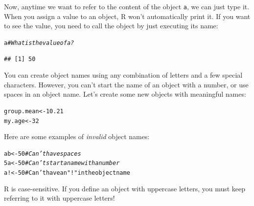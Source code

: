 \documentclass{tufte-book}\usepackage[]{graphicx}\usepackage[]{color}
\makeatletter
\newcommand{\hlnum}[1]{\textcolor[rgb]{0.686,0.059,0.569}{#1}}%
\newcommand{\hlstr}[1]{\textcolor[rgb]{0.192,0.494,0.8}{#1}}%
\newcommand{\hlcom}[1]{\textcolor[rgb]{0.678,0.584,0.686}{\textit{#1}}}%
\newcommand{\hlstd}[1]{\textcolor[rgb]{0.345,0.345,0.345}{#1}}%
\newcommand{\hlkwb}[1]{\textcolor[rgb]{0.69,0.353,0.396}{#1}}%
\newenvironment{kframe}{%
 \def\at@end@of@kframe{}%
 \ifinner\ifhmode%
  \def\at@end@of@kframe{\end{minipage}}%
  \begin{minipage}{\columnwidth}%
 \fi\fi%
 \def\FrameCommand##1{\hskip\@totalleftmargin \hskip-\fboxsep
 \colorbox{shadecolor}{##1}\hskip-\fboxsep
     \hskip-\linewidth \hskip-\@totalleftmargin \hskip\columnwidth}%
 \MakeFramed {\advance\hsize-\width
   \@totalleftmargin\z@ \linewidth\hsize
   \@setminipage}}%
 {\par\unskip\endMakeFramed%
 \at@end@of@kframe}
\newenvironment{knitrout}{}{} %
\makeatother
\begin{document}
Now, anytime we want to refer to the content of the object \texttt{a}, we can just type it. When you assign a value to an object, R won't automatically print it. If you want to see the value, you need to call the object by just executing its name:


\begin{knitrout}
\color{fgcolor}\begin{kframe}
\begin{alltt}
\hlstd{a} \hlcom{# What is the value of a?}
\end{alltt}
\begin{verbatim}
## [1] 50
\end{verbatim}
\end{kframe}
\end{knitrout}

You can create object names using any combination of letters and a few special characters. However, you can't start the name of an object with a number, or use spaces in an object name. Let's create some new objects with meaningful names:

\begin{knitrout}
\color{fgcolor}\begin{kframe}
\begin{alltt}
\hlstd{group.mean} \hlkwb{<-} \hlnum{10.21}
\hlstd{my.age} \hlkwb{<-} \hlnum{32}
\end{alltt}
\end{kframe}
\end{knitrout}

Here are some examples of \textit{invalid} object names:


\begin{knitrout}
\color{fgcolor}\begin{kframe}
\begin{alltt}
a b <- 50 \hlcom{# Can't have spaces}
5a <- 50 \hlcom{# Can't start a name with a number}
a! <- 5 0# Can't have an \hlstr{"!"} in the object name
\end{alltt}
\end{kframe}
\end{knitrout}

R is case-sensitive. If you define an object with uppercase letters, you must keep referring to it with uppercase letters!

\end{document}
